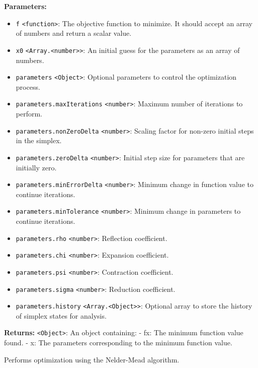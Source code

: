 \documentclass[12pt,a4paper]{article}
\begin{document}
\noindent \textbf{Parameters:}
\begin{itemize}
  \item \texttt{f} \texttt{<function>}: The objective function to minimize. It should accept an array of numbers and return a scalar value.
  \item \texttt{x0} \texttt{<Array.<number>>}: An initial guess for the parameters as an array of numbers.
  \item \texttt{parameters} \texttt{<Object>}: Optional parameters to control the optimization process.
  \item \texttt{parameters.maxIterations} \texttt{<number>}: Maximum number of iterations to perform.
  \item \texttt{parameters.nonZeroDelta} \texttt{<number>}: Scaling factor for non-zero initial steps in the simplex.
  \item \texttt{parameters.zeroDelta} \texttt{<number>}: Initial step size for parameters that are initially zero.
  \item \texttt{parameters.minErrorDelta} \texttt{<number>}: Minimum change in function value to continue iterations.
  \item \texttt{parameters.minTolerance} \texttt{<number>}: Minimum change in parameters to continue iterations.
  \item \texttt{parameters.rho} \texttt{<number>}: Reflection coefficient.
  \item \texttt{parameters.chi} \texttt{<number>}: Expansion coefficient.
  \item \texttt{parameters.psi} \texttt{<number>}: Contraction coefficient.
  \item \texttt{parameters.sigma} \texttt{<number>}: Reduction coefficient.
  \item \texttt{parameters.history} \texttt{<Array.<Object>>}: Optional array to store the history of simplex states for analysis.
\end{itemize}

\noindent \textbf{Returns:} \texttt{<Object>}: An object containing:
- \textasciigrave{}fx\textasciigrave{}: The minimum function value found.
- \textasciigrave{}x\textasciigrave{}: The parameters corresponding to the minimum function value.

\noindent Performs optimization using the Nelder-Mead algorithm.

\vspace{5mm}
\noindent {}
\end{document}

